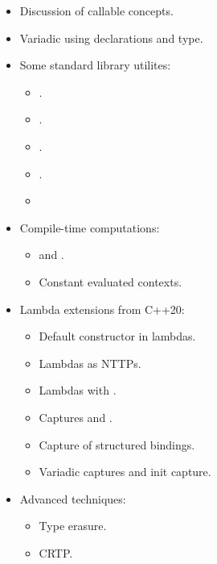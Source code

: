 \begin{itemize}
  \item Discussion of callable concepts.
  \item Variadic using declarations and  type.
  \item Some standard library utilites:
    \begin{itemize}
      \item {}.
      \item {}.
      \item {}.
      \item {}.
      \item {}
    \end{itemize}
  \item Compile-time computations:
    \begin{itemize}
      \item {} and .
      \item Constant evaluated contexts.
    \end{itemize}
  \item Lambda extensions from C++20:
    \begin{itemize}
      \item Default constructor in lambdas.
      \item Lambdas as NTTPs.
      \item Lambdas with .
      \item Captures \cppkey{[=,this]} and \cppkey{[*this]}.
      \item Capture of structured bindings.
      \item Variadic captures and init capture.
    \end{itemize}
  \item Advanced techniques:
    \begin{itemize}
      \item Type erasure.
      \item CRTP.
    \end{itemize}
\end{itemize}
